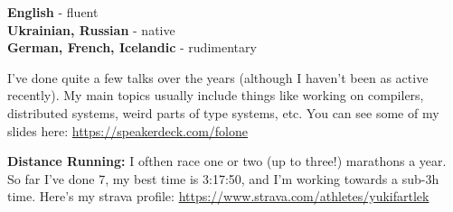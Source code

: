 \documentclass[9pt]{developercv} %
\begin{document}
\begin{minipage}[t]{0.3\textwidth}
	\vspace{-\baselineskip} %

	
	\textbf{English} - fluent\\
	\textbf{Ukrainian, Russian} - native\\
	\textbf{German, French, Icelandic} - rudimentary
\end{minipage}
\hfill
\begin{minipage}[t]{0.3\textwidth}
	\vspace{-\baselineskip} %


	I've done quite a few talks over the years (although I haven't been as active recently). My main topics usually include things like working on compilers, distributed systems, weird parts of type systems, etc. You can see some of my slides here: \href{https://www.strava.com/athletes/7428515}{https://speakerdeck.com/folone}
\end{minipage}
\hfill
\begin{minipage}[t]{0.3\textwidth}
	\vspace{-\baselineskip} %
	

	\textbf{Distance Running:} I ofthen race one or two (up to three!) marathons a year. So far I've done 7, my best time is 3:17:50, and I'm working towards a sub-3h time. Here's my strava profile: \href{https://www.strava.com/athletes/yukifartlek}{https://www.strava.com/athletes/yukifartlek}
\end{minipage}


\end{document}
